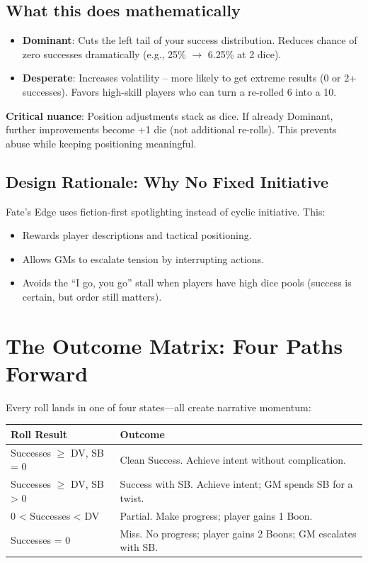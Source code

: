 \documentclass[11pt]{article}
\begin{document}
\subsection{What this does mathematically}
\begin{itemize}
    \item \textbf{Dominant}: Cuts the left tail of your success distribution. Reduces chance of zero successes dramatically (e.g., 25\% $\rightarrow$ 6.25\% at 2 dice).
    \item \textbf{Desperate}: Increases volatility -- more likely to get extreme results (0 or 2+ successes). Favors high-skill players who can turn a re-rolled 6 into a 10.
\end{itemize}

\textbf{Critical nuance}: Position adjustments stack as dice. If already Dominant, further improvements become +1 die (not additional re-rolls). This prevents abuse while keeping positioning meaningful.

\subsection{Design Rationale: Why No Fixed Initiative}
Fate's Edge uses fiction-first spotlighting instead of cyclic initiative. This:
\begin{itemize}
    \item Rewards player descriptions and tactical positioning.
    \item Allows GMs to escalate tension by interrupting actions.
    \item Avoids the ``I go, you go'' stall when players have high dice pools (success is certain, but order still matters).
\end{itemize}

\section{The Outcome Matrix: Four Paths Forward}

Every roll lands in one of four states---all create narrative momentum:

\begin{table}[h]
\centering
\begin{tabular}{ll}
\toprule
\textbf{Roll Result} & \textbf{Outcome} \\
\midrule
Successes $\geq$ DV, SB = 0 & Clean Success. Achieve intent without complication. \\
Successes $\geq$ DV, SB > 0 & Success with SB. Achieve intent; GM spends SB for a twist. \\
0 < Successes < DV & Partial. Make progress; player gains 1 Boon. \\
Successes = 0 & Miss. No progress; player gains 2 Boons; GM escalates with SB. \\
\bottomrule
\end{tabular}
\end{table}
\end{document}
